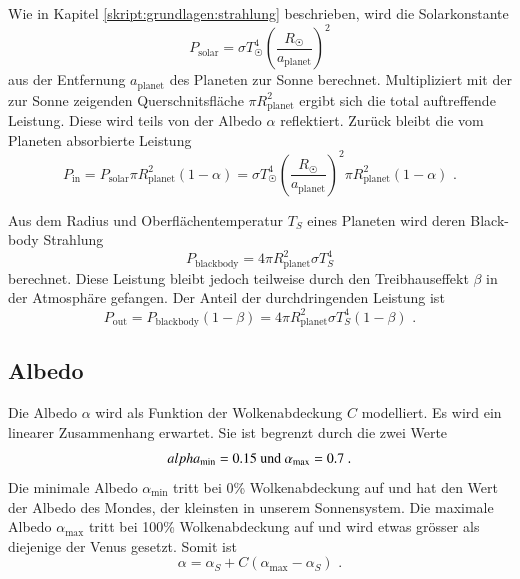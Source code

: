\begin{refsection}
Wie in Kapitel \ref{skript:grundlagen:strahlung} beschrieben, wird die Solarkonstante
\begin{equation}
P_{\text{solar}} = \sigma T_{\astrosun}^4 \left( \frac{R_{\astrosun}}{a_{\text{planet}}} \right) ^2
\end{equation}
aus der Entfernung $a_{\text{planet}}$ des Planeten zur Sonne berechnet. Multipliziert mit der zur Sonne zeigenden Querschnitsfläche $\pi R_{\text{planet}}^2$ ergibt sich die total auftreffende Leistung. Diese wird teils von der Albedo $\alpha$ reflektiert. Zurück bleibt die vom Planeten absorbierte Leistung \begin{equation}
P_{\text{in}} = P_{\text{solar}}  \pi R_{\text{planet}}^2 (1-\alpha) = \sigma T_{\astrosun}^4 \left( \frac{R_{\astrosun}}{a_{\text{planet}}} \right) ^2 \pi R_{\text{planet}}^2 (1-\alpha)\text{ .}
\end{equation}

Aus dem Radius und Oberflächentemperatur $T_{S}$ eines Planeten wird deren Black-body Strahlung \begin{equation}
P_{\text{blackbody}} = 4 \pi R_{\text{planet}}^2 \sigma T_{S}^4
\end{equation}
berechnet. Diese Leistung bleibt jedoch teilweise durch den Treibhauseffekt $\beta$ in der Atmosphäre gefangen. Der Anteil der durchdringenden Leistung ist
\begin{equation}
P_{\text{out}} = P_{\text{blackbody}} (1 - \beta) = 4 \pi R_{\text{planet}}^2 \sigma T_{S}^4 (1 - \beta)\text{ .}
\end{equation}

\subsection{Albedo}
Die Albedo $\alpha$ wird als Funktion der Wolkenabdeckung $C$ modelliert. Es wird ein linearer Zusammenhang erwartet. Sie ist begrenzt durch die zwei Werte
\begin{equation}
\\alpha_{\text{min}} = 0.15 \text{ und } \alpha_{\text{max}} = 0.7 \text{ .}
\end{equation}
Die minimale Albedo $\alpha_{\text{min}}$ tritt bei 0\% Wolkenabdeckung auf und hat den Wert der Albedo des Mondes, der kleinsten in unserem Sonnensystem. Die maximale Albedo $\alpha_{\text{max}}$ tritt bei 100\% Wolkenabdeckung auf und wird etwas grösser als diejenige der Venus gesetzt. Somit ist
\begin{equation}
\alpha = \alpha_S + C(\alpha_{\text{max}} - \alpha_S) \text{ .}
\end{equation}


\end{refsection}
